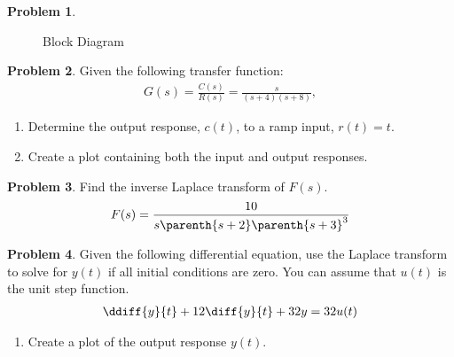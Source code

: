 \documentclass[10pt]{article}
\theoremstyle{definition}
\newtheorem{prob}{Problem}[section]
\newenvironment{subprob}%
{\renewcommand{\theenumi}{\alph{enumi}}\renewcommand{\labelenumi}{(\theenumi)}\begin{enumerate}}%
{\end{enumerate}}%
\begin{document}
\begin{prob}
\begin{subprob}
\begin{figure}[h]
\begin{scaletikzpicturetowidth}{2\textwidth}
            \end{scaletikzpicturetowidth}
            \caption{Block Diagram~\label{fig:bd2}}
        \end{figure}
    \end{subprob}
\end{prob}

\begin{prob}
    Given the following transfer function:
    \begin{align*}
        G(s) = \frac{C(s)}{R(s)} = \frac{s}{(s +4)(s+8)} ,
    \end{align*}
    \begin{subprob}
        \item Determine the output response, \( c(t) \), to a ramp input, \( r(t) = t \).
        \item Create a plot containing both the input and output responses.
    \end{subprob}
\end{prob}

\begin{prob}
    Find the inverse Laplace transform of \( F(s)\).
    \begin{align*}
        F(s) = \frac{10}{s \parenth{s+2}\parenth{s+3}^3}
    \end{align*}
\end{prob}



\begin{prob}
    Given the following differential equation, use the Laplace transform to solve for \( y(t) \) if all initial conditions are zero. 
    You can assume that \(u(t) \) is the unit step function.
    \begin{align*}
        \ddiff{y}{t} + 12 \diff{y}{t} + 32 y = 32 u(t)
    \end{align*}

    \begin{subprob}
    \item Create a plot of the output response \( y(t) \).
    \end{subprob}
\end{prob}
\end{document}
